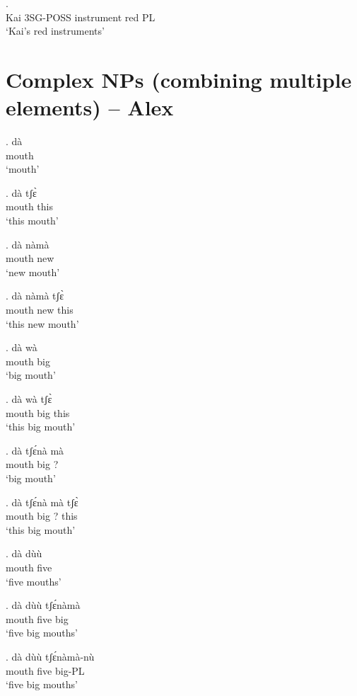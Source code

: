 \documentclass{assets/fieldnotes}
\begin{document}
\exg.  \\
Kai 3SG-POSS instrument red PL \\
`Kai's red instruments'




\section{Complex NPs (combining multiple elements) -- Alex} 

\exg. dà    \\
mouth \\
`mouth'

\exg.
dà      tʃɛ̀  \\
mouth   this \\%
`this mouth'

\exg.
dà      nàmà \\
mouth   new  \\%
`new mouth'

\exg.
dà      nàmà   tʃɛ̀  \\
mouth   new    this \\%
`this new mouth'

\exg.
dà      wà  \\
mouth   big \\%
`big mouth'

\exg.
dà      wà    tʃɛ̀  \\
mouth   big   this \\%
`this big mouth'

\exg.
dà      tʃɛ́nà   mà \\
mouth   big     ?  \\%
`big mouth'

\exg.
dà      tʃɛ́nà   mà   tʃɛ̀  \\
mouth   big     ?    this \\%
`this big mouth'

\exg.
dà      dùù  \\
mouth   five \\%
`five mouths'

\exg.
dà      dùù    tʃɛ́nàmà \\
mouth   five   big     \\%
`five big mouths'

\exg.
dà      dùù    tʃɛ́nàmà-nù \\
mouth   five   big-PL     \\%
`five big mouths'
\end{document}

